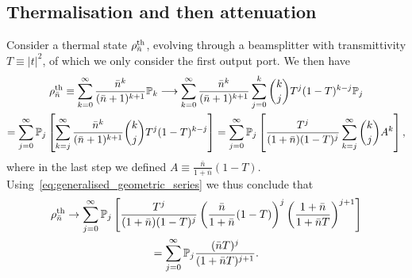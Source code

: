 \documentclass[a4paper]{report}
\newcommand{\PP}{\mathbb{P}}
\begin{document}
\subsection{Thermalisation and then attenuation}


\begin{prop}
	Consider a thermal state $\rho^{\rm th}_{\bar n}$, evolving through a beamsplitter with transmittivity $T\equiv |t|^2$, of which we only consider the first output port. We then have
	\begin{equation}
	\begin{gathered}
		\rho^{\rm th}_{\bar n}
		\equiv \sum_{k=0}^\infty \frac{\bar n^k}{(\bar n+1)^{k+1}}\PP_k
		\longrightarrow
		\sum_{k=0}^\infty \frac{\bar n^k}{(\bar n+1)^{k+1}}
		\sum_{j=0}^k \binom{k}{j} T^j (1-T)^{k-j} \PP_j \\
		= \sum_{j=0}^\infty \PP_j \left[
			\sum_{k=j}^\infty 
			\frac{\bar n^k}{(\bar n+1)^{k+1}}
			\binom{k}{j}
			T^j (1-T)^{k-j}
		\right]
		= \sum_{j=0}^\infty \PP_j \left[
			\frac{T^j}{(1+\bar n)(1-T)^j}
			\sum_{k=j}^\infty \binom{k}{j} A^k
		\right],
	\end{gathered}
	\end{equation}
	where in the last step we defined $A\equiv \frac{\bar n}{1+\bar n}(1-T)$.
	Using~\cref{eq:generalised_geometric_series} we thus conclude that
	\begin{equation}
	\begin{gathered}
		\rho^{\rm th}_{\bar n} \to
		\sum_{j=0}^\infty \PP_j
		\left[
			\frac{T^j}{(1+\bar n)(1-T)^j}
			\left(\frac{\bar n}{1+\bar n}(1-T)\right)^j
			\left(\frac{1+\bar n}{1+\bar n T}\right)^{j+1}
		\right] \\
		= \sum_{j=0}^\infty \PP_j
		\frac{(\bar n T)^j}{(1+\bar nT)^{j+1}}.
	\end{gathered}
	\end{equation}
\end{prop}
\end{document}
